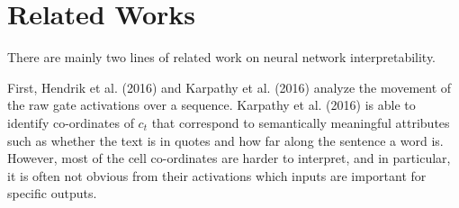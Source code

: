 \documentclass{article}
\begin{document}


\section{Related Works}

There are mainly two lines of related work on neural network interpretability.


First, Hendrik et al. (2016) and Karpathy et al. (2016) analyze the movement of the raw gate activations over a sequence.
Karpathy et al. (2016) is able to identify co-ordinates of $c_t$ that correspond to semantically meaningful attributes such as whether the text is in quotes and how far along the sentence a word is. However, most of the cell co-ordinates are harder to interpret, and in particular, it is often not obvious from their activations which inputs are important for specific outputs.
\end{document}
